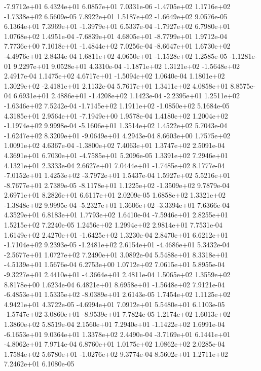-7.9712e+01  6.4324e+01  6.0857e+01  7.0331e-06
-1.4705e+02  1.1716e+02 -1.7338e+02  6.5609e-05
 7.8922e+01  1.5187e+02 -1.6649e+02  9.0576e-05
 6.1364e+01  7.3969e+01 -1.3979e+01  6.5337e-04
-1.7927e+02  6.7980e+01  1.0768e+02  1.4951e-04
-7.6839e+01  4.6805e+01 -8.7799e+01  1.9712e-04
 7.7736e+00  7.1018e+01 -1.4844e+02  7.0256e-04
-8.6647e+01  1.6730e+02 -4.4976e+01  2.8434e-04
 1.6811e+02  4.0650e+01 -1.1528e+02  1.2585e-05
-1.1281e-01  9.2297e+01  9.0528e+01  4.3310e-04
-1.1871e+02  1.3121e+02 -1.5648e+02  2.4917e-04
 1.1475e+02  4.6717e+01 -1.5094e+02  1.0640e-04
 1.1801e+02  1.3029e+02 -2.4181e+01  2.1132e-04
5.7617e+01 1.3411e+02 4.0858e+01  8.8575e-04
 6.6931e+01  2.4886e+01 -1.4208e+02  1.1423e-04
-2.2395e+01  1.2511e+02 -1.6346e+02  7.5242e-04
-1.7145e+02  1.1911e+02 -1.0850e+02  5.1684e-05
 4.3185e+01  2.9564e+01 -7.1949e+00  1.9578e-04
 1.4180e+02  1.2004e+02 -1.1974e+02  9.9998e-04
-5.1606e+01  1.3514e+02  1.4522e+02  5.7043e-04
-1.6247e+02  8.3209e+01 -9.0649e+01  4.2943e-04
8.6603e+00 1.7575e+02 1.0091e+02  4.6367e-04
-1.3800e+02  7.4063e+01  1.3747e+02  2.5091e-04
 4.3691e+01  6.7030e+01 -4.7585e+01  5.2096e-05
1.3391e+02 7.2946e+01 4.1321e+01  2.3333e-04
 2.6627e+01  7.0444e+01 -1.7485e+02  8.1777e-04
-7.0152e+01  1.4253e+02 -3.7972e+01  1.5437e-04
 1.5927e+02  5.5216e+01 -8.7677e+01  2.7389e-05
-8.1178e+01  1.1225e+02 -1.3509e+02  9.7879e-04
2.6971e+01 8.2826e+01 6.6117e+01  2.0209e-05
 1.6858e+02  1.3321e+02 -1.3848e+02  9.9995e-04
-5.2327e+01  1.3606e+02 -3.3394e+01  7.6366e-04
4.3529e+01 6.8183e+01 1.7793e+02  1.6410e-04
-7.5946e+01  2.8255e+01  1.5215e+02  7.2240e-05
1.2456e+02 1.2994e+02 2.9814e+01  7.7531e-04
 1.6149e+02  2.4270e+01 -1.6425e+02  1.3230e-04
 2.8470e+01  6.6212e+01 -1.7104e+02  9.2393e-05
-1.2481e+02  2.6154e+01 -4.4686e+01  5.3432e-04
-2.5677e+01  1.0727e+02  7.2490e+01  3.0892e-04
 5.5488e+01  8.3318e+01 -4.5139e+01  1.5676e-04
6.2753e+00 1.0712e+02 7.0615e+01  5.8955e-04
-9.3227e+01  2.4410e+01 -4.3664e+01  2.4811e-04
1.5065e+02 1.3559e+02 8.8178e+00  1.6234e-04
 6.4821e+01  8.6958e+01 -1.5648e+02  7.9121e-04
-6.4853e+01  1.5335e+02 -8.0389e+01  2.6143e-05
1.7454e+02 1.1125e+02 4.9421e+01  4.3722e-05
-4.6994e+01  7.0912e+01  5.5480e+01  6.1103e-05
-1.5747e+02  3.0860e+01 -8.9539e+01  7.7824e-05
1.2174e+02 1.6013e+02 1.3860e+02  5.8519e-04
 2.1560e+01  7.2940e+01 -1.1422e+02  1.6991e-04
-6.1653e+01  9.0364e+01  1.3378e+02  2.4490e-04
-3.7169e+01  6.1441e+01 -4.8062e+01  7.9714e-04
6.8760e+01 1.0175e+02 1.0862e+02  2.0285e-04
 1.7584e+02  5.6780e+01 -1.0276e+02  9.3774e-04
8.5602e+01 1.2711e+02 7.2462e+01  6.1080e-05
